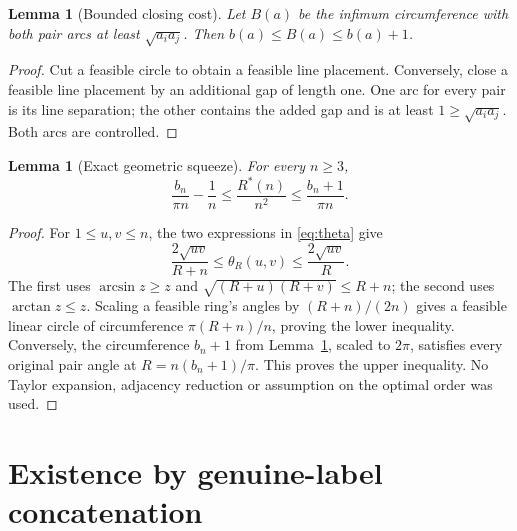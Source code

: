 \documentclass[11pt]{article}
\newtheorem{lemma}[theorem]{Lemma}
\theoremstyle{definition}\newtheorem{definition}[theorem]{Definition}
\theoremstyle{remark}\newtheorem{remark}[theorem]{Remark}
\newcommand{\Rstar}{R^\ast}
\DeclareMathOperator{\atan}{arctan}
\DeclareMathOperator{\asin}{arcsin}
\begin{document}
\begin{lemma}[Bounded closing cost]\label{lem:closing}
Let $B(a)$ be the infimum circumference with both pair arcs at least
$\sqrt{a_i a_j}$. Then $b(a)\le B(a)\le b(a)+1$.
\end{lemma}
\begin{proof}
Cut a feasible circle to obtain a feasible line placement. Conversely,
close a feasible line placement by an additional gap of length one. One
arc for every pair is its line separation; the other contains the added
gap and is at least $1\ge\sqrt{a_i a_j}$. Both arcs are controlled.
\end{proof}

\begin{lemma}[Exact geometric squeeze]\label{lem:squeeze}
For every $n\ge3$,
\begin{equation}\label{eq:squeeze}
 \frac{b_n}{\pi n}-\frac1n
 \le\frac{\Rstar(n)}{n^2}\le\frac{b_n+1}{\pi n}.
\end{equation}
\end{lemma}
\begin{proof}
For $1\le u,v\le n$, the two expressions in \eqref{eq:theta} give
\[
 \frac{2\sqrt{uv}}{R+n}\le\theta_R(u,v)\le\frac{2\sqrt{uv}}R.
\]
The first uses $\asin z\ge z$ and
$\sqrt{(R+u)(R+v)}\le R+n$; the second uses $\atan z\le z$.
Scaling a feasible ring's angles by $(R+n)/(2n)$ gives a feasible linear
circle of circumference $\pi(R+n)/n$, proving the lower inequality.
Conversely, the circumference $b_n+1$ from Lemma~\ref{lem:closing},
scaled to $2\pi$, satisfies every original pair angle at
$R=n(b_n+1)/\pi$. This proves the upper inequality. No Taylor expansion,
adjacency reduction or assumption on the optimal order was used.
\end{proof}

\section{Existence by genuine-label concatenation}
\end{document}
